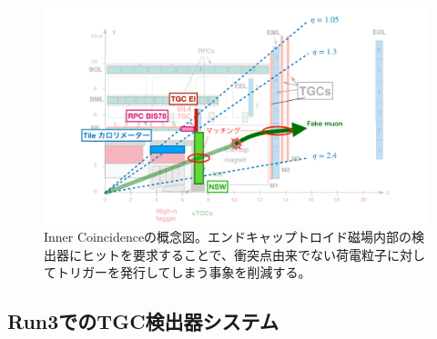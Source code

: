 \begin{figure} 
    \centering
    \includegraphics[width=16cm]{fig/Intro/TGC_Inner_concept.pdf}
    \caption[フェイクトリガーの例]{Inner Coincidenceの概念図\cite{mt_kawamoto}。エンドキャップトロイド磁場内部の検出器にヒットを要求することで、衝突点由来でない荷電粒子に対してトリガーを発行してしまう事象を削減する。}
    \label{TGC_Inner_concept}
\end{figure}

    \subsection{Run3でのTGC検出器システム}

